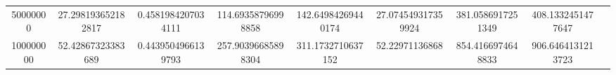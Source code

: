 \begin{table}[ht]
{\begin{tabular}{@{}S[table-format=9]SSSSSSSS@{}}
            50000000            & 27.298193652182817  & 0.4581984207034111 & 114.69358796998858 & 142.64984269440174 & 27.074549317359924 & 381.0586917251349  & 408.1332451477647  \\
            100000000           & 52.42867323383689   & 0.4439504966139793 & 257.90396685898304 & 311.1732710637152  & 52.22971136868     & 854.4166974648833  & 906.6464131213723  \\
            \bottomrule
        \end{tabular}\label{table:efficiency_csv-70percent}
    }
\end{table}